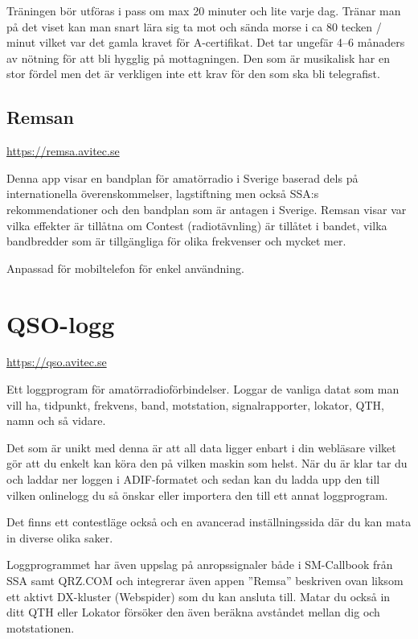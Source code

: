 Träningen bör utföras i pass om max 20 minuter och lite varje
dag. Tränar man på det viset kan man snart lära sig ta mot och sända
morse i ca 80 tecken / minut vilket var det gamla kravet för
A-certifikat. Det tar ungefär 4--6 månaders av nötning för att bli
hygglig på mottagningen. Den som är musikalisk har en stor fördel men
det är verkligen inte ett krav för den som ska bli telegrafist.

\subsection{Remsan}

\url{https://remsa.avitec.se}

Denna app visar en bandplan för amatörradio i Sverige baserad dels på
internationella överenskommelser, lagstiftning men också SSA:s
rekommendationer och den bandplan som är antagen i Sverige. Remsan
visar var vilka effekter är tillåtna om Contest (radiotävnling) är
tillåtet i bandet, vilka bandbredder som är tillgängliga för olika
frekvenser och mycket mer.

Anpassad för mobiltelefon för enkel användning.

\section{QSO-logg}

\url{https://qso.avitec.se}

Ett loggprogram för amatörradioförbindelser. Loggar de vanliga datat
som man vill ha, tidpunkt, frekvens, band, motstation,
signalrapporter, lokator, QTH, namn och så vidare.

Det som är unikt med denna är att all data ligger enbart i din
webläsare vilket gör att du enkelt kan köra den på vilken maskin som
helst. När du är klar tar du och laddar ner loggen i ADIF-formatet och
sedan kan du ladda upp den till vilken onlinelogg du så önskar eller
importera den till ett annat loggprogram.

Det finns ett contestläge också och en avancerad inställningssida där
du kan mata in diverse olika saker.

Loggprogrammet har även uppslag på anropssignaler både i SM-Callbook
från SSA samt QRZ.COM och integrerar även appen ''Remsa'' beskriven
ovan liksom ett aktivt DX-kluster (Webspider) som du kan ansluta
till. Matar du också in ditt QTH eller Lokator försöker den även
beräkna avståndet mellan dig och motstationen.
